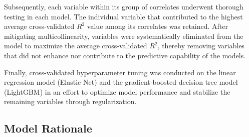 \documentclass[12pt,a4paper,english]{article}
\begin{document}
\begin{table}[H]
	\centering
	\caption{Correlated Variable Groups}
	\label{tab:var-correlates}
\end{table}


Subsequently, each variable within its group of correlates underwent thorough testing in each model. The individual variable that contributed to the highest average cross-validated $R^2$ value among its correlates was retained. After mitigating multicollinearity, variables were systematically eliminated from the model to maximize the average cross-validated $R^2$, thereby removing variables that did not enhance nor contribute to the predictive capability of the models.

Finally, cross-validated hyperparameter tuning was conducted on the linear regression model (Elastic Net) and the gradient-boosted decision tree model (LightGBM) in an effort to optimize model performance and stabilize the remaining variables through regularization.

\subsection{Model Rationale}
\end{document}
